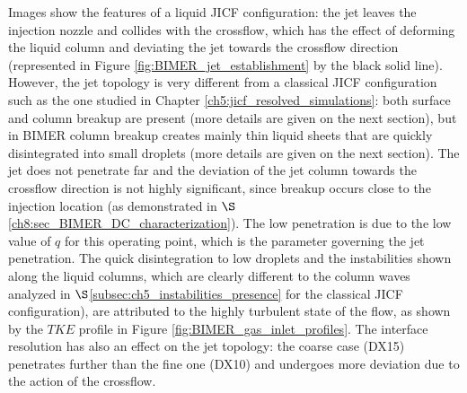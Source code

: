 Images show the features of a liquid JICF configuration: the jet leaves the injection nozzle and collides with the crossflow, which has the effect of deforming the liquid column and deviating the jet towards the crossflow direction (represented in Figure \ref{fig:BIMER_jet_establishment} by the black solid line). However, the jet topology is very different from a classical JICF configuration such as the one studied in Chapter \ref{ch5:jicf_resolved_simulations}: both surface and column breakup are present (more details are given on the next section), but in BIMER column breakup creates mainly thin liquid sheets that are quickly disintegrated into small droplets (more details are given on the next section). The jet does not penetrate far and the deviation of the jet column towards the crossflow direction is not highly significant, since breakup occurs close to the injection location (as demonstrated in $\S$\ref{ch8:sec_BIMER_DC_characterization}). The low penetration is due to the low value of $q$ for this operating point, which is the parameter governing the jet penetration. The quick disintegration to low droplets and the instabilities shown along the liquid columns, which are clearly different to the column waves analyzed in $\S$\ref{subsec:ch5_instabilities_presence} for the classical JICF configuration), are attributed to the highly turbulent state of the flow, as shown by the $TKE$ profile in Figure \ref{fig:BIMER_gas_inlet_profiles}. The interface resolution has also an effect on the jet topology: the coarse case (DX15) penetrates further than the fine one (DX10) and undergoes more deviation due to the action of the crossflow. 




%



